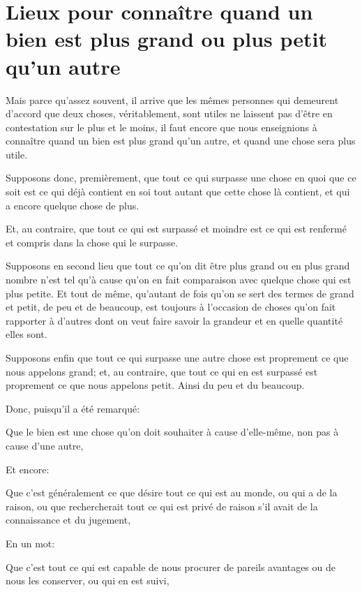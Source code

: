 
\section{Lieux pour connaître quand un bien est plus grand ou plus petit qu'un autre}

Mais parce qu'assez souvent, il arrive que les mêmes personnes qui demeurent d'accord que deux choses,
véritablement, sont utiles ne laissent pas d'être en contestation sur le plus et le moins, il faut encore
que nous enseignions à connaître quand un bien est plus grand qu'un autre, et quand une chose sera plus
utile. 

Supposons donc, premièrement, que tout ce qui surpasse une chose en quoi que ce soit est ce qui déjà contient
en soi tout autant que cette chose là contient, et qui a encore quelque chose de plus.

Et, au contraire, que tout ce qui est surpassé et moindre est ce qui est renfermé et compris dans la chose
qui le surpasse.

Supposons en second lieu que tout ce qu'on dit être plus grand ou en plus grand nombre n'est tel qu'à cause
qu'on en fait comparaison avec quelque chose qui est plus petite. Et tout de même, qu'autant de fois qu'on
se sert des termes de grand et petit, de peu et de beaucoup, est toujours à l'occasion de choses qu'on fait
rapporter à d'autres dont on veut faire savoir la grandeur et en quelle quantité elles sont.

Supposons enfin que tout ce qui surpasse une autre chose est proprement ce que nous appelons grand; et, au
contraire, que tout ce qui en est surpassé est proprement ce que nous appelons petit. Ainsi du peu et du
beaucoup.

\bigbreak

Donc, puisqu'il a été remarqué:

\begin{emphpar}
	Que le bien est une chose qu'on doit souhaiter à cause d'elle-même, non pas à cause d'une autre,
\end{emphpar}

Et encore:

\begin{emphpar}
	Que c'est généralement ce que désire tout ce qui est au monde, ou qui a de la raison, ou que rechercherait
	tout ce qui est privé de raison s'il avait de la connaissance et du jugement,
\end{emphpar}

En un mot:

\begin{emphpar}
	Que c'est tout ce qui est capable de nous procurer de pareils avantages ou de nous les conserver, ou qui
	en est suivi,
\end{emphpar}


